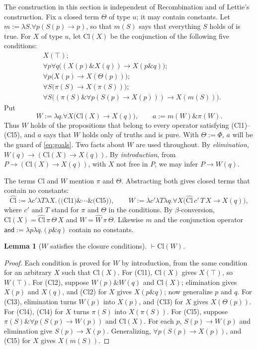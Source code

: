 \documentclass[12pt,leqno]{article}
\newcommand{\AND}{\ensuremath{\mathbin{\&}}}
\newcommand{\IC}{\ensuremath{\rightarrow}}
\newcommand{\dentails}{\ensuremath{\vdash}}
\newcommand{\Cl}{\ensuremath{\mathrm{Cl}}}
\newcommand{\hW}{\ensuremath{\widehat{W}}}
\newcommand{\hCl}{\ensuremath{\widehat{\Cl}}}
\newcommand{\conj}{\ensuremath{\mathsf{and}}}
\theoremstyle{plain}
\newtheorem{lemma}{Lemma}
\begin{document}
The construction in this section is independent of Recombination and of
Lettie's construction. Fix a closed term \(\Theta\) of type \(u\); it
may contain constants. Let \(m:=\lambda S.\forall p(S(p)\IC p)\), so that
\(m(S)\) says that everything \(S\) holds of is true. For \(X\)
of type \(u\), let \(\Cl(X)\) be the conjunction of the following five
conditions:
\begin{align}
 &X(\top); \tag{Cl1}\\
 &\forall p\forall q\bigl((X(p)\AND X(q))\IC X(p\AND q)\bigr); \tag{Cl2}\\
 &\forall p\bigl(X(p)\IC X(\Theta(p))\bigr); \tag{Cl3}\\
 &\forall S\bigl(\pi(S)\IC X(\pi(S))\bigr); \tag{Cl4}\\
 &\forall S\bigl((\pi(S)\AND\forall p(S(p)\IC X(p)))\IC X(m(S))\bigr).
   \tag{Cl5}
\end{align}
Put
\[
 W:=\lambda q.\forall X\bigl(\Cl(X)\IC X(q)\bigr),\qquad
 a:=m(W)\AND\pi(W).
\]
Thus \(W\) holds of the propositions that belong to every operator
satisfying (Cl1)--(Cl5), and \(a\) says that \(W\) holds only of truths
and is pure. With \(\Theta:=\Phi\), \(a\) will be the guard of
\eqref{eq:goals}. Two facts about \(W\) are used throughout. By
\emph{elimination}, \(W(q)\IC(\Cl(X)\IC X(q))\). By \emph{introduction},
from \(P\IC(\Cl(X)\IC X(q))\), with \(X\) not free in \(P\), we may infer
\(P\IC W(q)\).

The terms \(\Cl\) and \(W\) mention \(\pi\) and \(\Theta\). Abstracting
both gives closed terms that contain no constants:
\[
 \hCl:=\lambda c'\lambda T\lambda X.\,\bigl(\text{(Cl1)}\AND\cdots\AND
   \text{(Cl5)}\bigr),\qquad
 \hW:=\lambda c'\lambda T\lambda q.\forall X\bigl(\hCl\,c'\,T\,X\IC X(q)\bigr),
\]
where \(c'\) and \(T\) stand for \(\pi\) and \(\Theta\) in the
conditions. By \(\beta\)-conversion, \(\Cl(X)=\hCl\,\pi\,\Theta\,X\) and
\(W=\hW\,\pi\,\Theta\). Likewise \(m\) and the conjunction operator
\(\conj:=\lambda p\lambda q.(p\AND q)\) contain no constants.

\begin{lemma}[\(W\) satisfies the closure conditions]\label{lem:ClW}
\(\dentails\Cl(W)\).
\end{lemma}
\begin{proof}
Each condition is proved for \(W\) by introduction, from the same
condition for an arbitrary \(X\) such that \(\Cl(X)\). For (Cl1),
\(\Cl(X)\) gives \(X(\top)\), so \(W(\top)\). For (Cl2), suppose
\(W(p)\AND W(q)\) and \(\Cl(X)\); elimination gives \(X(p)\) and
\(X(q)\), and (Cl2) for \(X\) gives \(X(p\AND q)\); now generalize \(p\)
and \(q\). For (Cl3), elimination turns \(W(p)\) into \(X(p)\), and
(Cl3) for \(X\) gives \(X(\Theta(p))\). For (Cl4), (Cl4) for \(X\) turns
\(\pi(S)\) into \(X(\pi(S))\). For (Cl5), suppose
\(\pi(S)\AND\forall p(S(p)\IC W(p))\) and \(\Cl(X)\). For each \(p\),
\(S(p)\IC W(p)\) and elimination give \(S(p)\IC X(p)\). Generalizing,
\(\forall p(S(p)\IC X(p))\), and (Cl5) for \(X\) gives \(X(m(S))\).
\end{proof}
\end{document}
